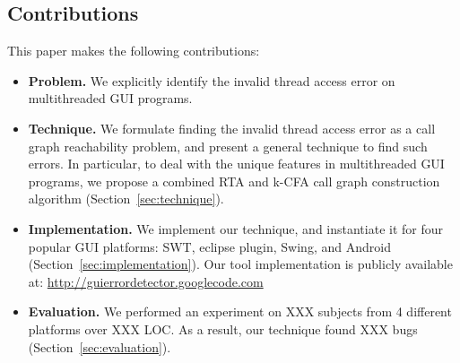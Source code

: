 \subsection{Contributions}

This paper makes the following contributions:

\begin{itemize}
\item \textbf{Problem.} We explicitly identify the invalid thread
access error on multithreaded GUI programs.

\item \textbf{Technique.} We formulate finding
the invalid thread access error as a call graph reachability problem,
and present a general technique to find such errors. 
In particular, to deal with the unique features in
multithreaded GUI programs, we propose a combined RTA and k-CFA
call graph construction algorithm (Section~\ref{sec:technique}).

\item \textbf{Implementation.} We implement our technique, and
instantiate it for four
popular GUI platforms: SWT, eclipse plugin, Swing, and Android (Section~\ref{sec:implementation}). Our
tool implementation is publicly available at:
\url{http://guierrordetector.googlecode.com}

\item \textbf{Evaluation.} We performed an experiment on XXX subjects
from 4 different platforms over XXX LOC. As a result, our technique
found XXX bugs (Section~\ref{sec:evaluation}).

\end{itemize}

